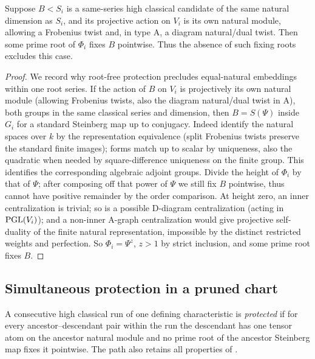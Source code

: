 \begin{corollary}\label{w:natural-root}
Suppose $B<S_i$ is a same-series high classical candidate of the same natural dimension as $S_i$, and its projective action on $V_i$ is its own natural module, allowing a Frobenius twist and, in type A, a diagram natural/dual twist. Then some prime root of $\Phi_i$ fixes $B$ pointwise. Thus the absence of such fixing roots excludes this case.
\end{corollary}
\begin{proof}
We record why root-free protection precludes equal-natural embeddings within one root series. If the action of \(B\) on \(V_i\) is projectively its own natural module (allowing Frobenius twists, also the diagram natural/dual twist in A), both groups in the same classical series and dimension, then \(B=S(\Psi)\) inside \(G_i\) for a standard Steinberg map up to conjugacy. Indeed identify the natural spaces over \(k\) by the representation equivalence (split Frobenius twists preserve the standard finite images); forms match up to scalar by uniqueness, also the quadratic when needed by square-difference uniqueness on the finite group. This identifies the corresponding algebraic adjoint groups. Divide the height of \(\Phi_i\) by that of \(\Psi\); after composing off that power of \(\Psi\) we still fix \(B\) pointwise, thus cannot have positive remainder by the order comparison. At height zero, an inner centralization is trivial; so is a possible D-diagram centralization (acting in \({\rm PGL}(V_i)\)); and a non-inner A-graph centralization would give projective self-duality of the finite natural representation, impossible by the distinct restricted weights and perfection. So \(\Phi_i=\Psi^z\), \(z>1\) by strict inclusion, and some prime root fixes \(B\).
\end{proof}

\subsection{Simultaneous protection in a pruned chart}

\begin{definition}\label{w:protected}
A consecutive high classical run of one defining characteristic is \emph{protected} if for every ancestor--descendant pair within the run the descendant has one tensor atom on the ancestor natural module and no prime root of the ancestor Steinberg map fixes it pointwise. The path also retains all properties of .
\end{definition}


